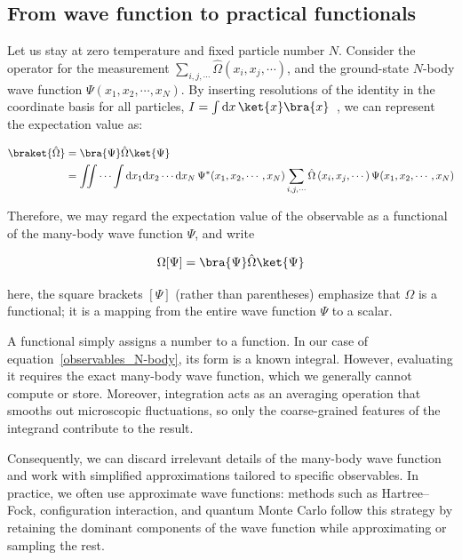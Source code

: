 \subsection{From wave function to practical functionals}

Let us stay at zero temperature and fixed particle number $N$.
Consider the operator for the measurement $\sum_{i,j,\cdots}\hat\Omega\left(x_i,x_j,\cdots\right)$,
and the ground-state $N$-body wave function $\Psi(x_1,x_2,\cdots,x_N)$.
By inserting resolutions of the identity in the coordinate basis for all particles, $I=\int \mathrm{d}x\,\ket{x}\bra{x}$~\cite{shankar2017quantum},
we can represent the expectation value as:

\begin{equation}
\begin{aligned}
    \braket{\hat\Omega} 
    &= \bra{\Psi}\hat\Omega\ket{\Psi} \\
    &= \iint\cdots\int \mathrm{d}x_1\mathrm{d}x_2\cdots\mathrm{d}x_N\,\Psi^*(x_1,x_2,\cdots,x_N)\sum_{i,j,\cdots}\hat\Omega\left(x_i,x_j,\cdots\right)\Psi(x_1,x_2,\cdots,x_N)
\end{aligned}
\label{observables_N-body}
\end{equation}

Therefore, we may regard the expectation value of the observable as a functional of the many-body wave function $\Psi$, and write

\begin{equation}
\Omega[\Psi] = \bra{\Psi}\hat{\Omega}\ket{\Psi}
\label{observables_functional}
\end{equation}

here, the square brackets $[\Psi]$ (rather than parentheses) emphasize that $\Omega$ is a functional; it is a mapping from the entire wave function $\Psi$ to a scalar.

A functional simply assigns a number to a function. In our case of equation~\eqref{observables_N-body}, its form is a known integral. However, evaluating it requires the exact many-body wave function, which we generally cannot compute or store. Moreover, integration acts as an averaging operation that smooths out microscopic fluctuations, so only the coarse-grained features of the integrand contribute to the result.

Consequently, we can discard irrelevant details of the many-body wave function and work with simplified approximations tailored to specific observables.
In practice, we often use approximate wave functions: methods such as Hartree--Fock, configuration interaction, and quantum Monte Carlo follow this strategy by retaining the dominant components of the wave function while approximating or sampling the rest.

